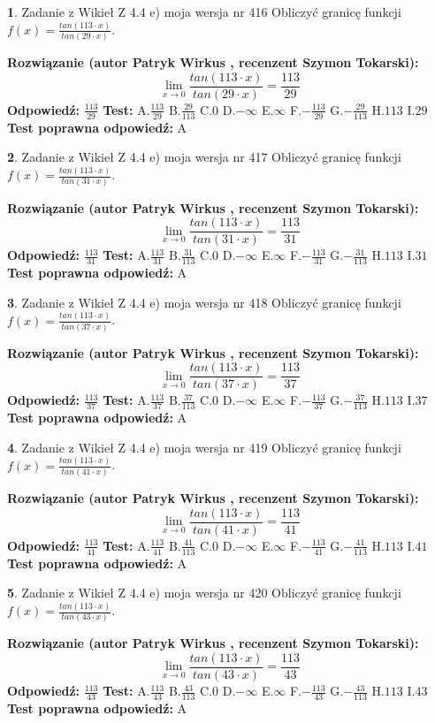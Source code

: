 \documentclass[12pt, a4paper]{article}
\theoremstyle{definition} %
\newtheorem{zad}{}
\newcommand{\zadStart}[1]{\begin{zad}#1\newline}
\newcommand{\zadStop}{\end{zad}}
\newcommand{\rozwStart}[2]{\noindent \textbf{Rozwiązanie (autor #1 , recenzent #2): }\newline}
\newcommand{\rozwStop}{\newline}
\newcommand{\odpStart}{\noindent \textbf{Odpowiedź:}\newline}
\newcommand{\odpStop}{\newline}
\newcommand{\testStart}{\noindent \textbf{Test:}\newline}
\newcommand{\testStop}{\newline}
\newcommand{\kluczStart}{\noindent \textbf{Test poprawna odpowiedź:}\newline}
\newcommand{\kluczStop}{\newline}
\begin{document}
\zadStart{Zadanie z Wikieł Z 4.4 e) moja wersja nr 416}
Obliczyć granicę funkcji $f(x)=\frac{tan(113\cdot x)}{tan(29\cdot x)}$.
\zadStop
\rozwStart{Patryk Wirkus}{Szymon Tokarski}
$$\lim\limits_{x\to 0}\frac{tan(113\cdot x)}{tan(29\cdot x)}=
\frac{113}{29}$$
\rozwStop
\odpStart
$\frac{113}{29}$
\odpStop
\testStart
A.$\frac{113}{29}$
B.$\frac{29}{113}$
C.$0$
D.$-\infty$
E.$\infty$
F.$-\frac{113}{29}$
G.$-\frac{29}{113}$
H.$113$
I.$29$
\testStop
\kluczStart
A
\kluczStop



\zadStart{Zadanie z Wikieł Z 4.4 e) moja wersja nr 417}
Obliczyć granicę funkcji $f(x)=\frac{tan(113\cdot x)}{tan(31\cdot x)}$.
\zadStop
\rozwStart{Patryk Wirkus}{Szymon Tokarski}
$$\lim\limits_{x\to 0}\frac{tan(113\cdot x)}{tan(31\cdot x)}=
\frac{113}{31}$$
\rozwStop
\odpStart
$\frac{113}{31}$
\odpStop
\testStart
A.$\frac{113}{31}$
B.$\frac{31}{113}$
C.$0$
D.$-\infty$
E.$\infty$
F.$-\frac{113}{31}$
G.$-\frac{31}{113}$
H.$113$
I.$31$
\testStop
\kluczStart
A
\kluczStop



\zadStart{Zadanie z Wikieł Z 4.4 e) moja wersja nr 418}
Obliczyć granicę funkcji $f(x)=\frac{tan(113\cdot x)}{tan(37\cdot x)}$.
\zadStop
\rozwStart{Patryk Wirkus}{Szymon Tokarski}
$$\lim\limits_{x\to 0}\frac{tan(113\cdot x)}{tan(37\cdot x)}=
\frac{113}{37}$$
\rozwStop
\odpStart
$\frac{113}{37}$
\odpStop
\testStart
A.$\frac{113}{37}$
B.$\frac{37}{113}$
C.$0$
D.$-\infty$
E.$\infty$
F.$-\frac{113}{37}$
G.$-\frac{37}{113}$
H.$113$
I.$37$
\testStop
\kluczStart
A
\kluczStop



\zadStart{Zadanie z Wikieł Z 4.4 e) moja wersja nr 419}
Obliczyć granicę funkcji $f(x)=\frac{tan(113\cdot x)}{tan(41\cdot x)}$.
\zadStop
\rozwStart{Patryk Wirkus}{Szymon Tokarski}
$$\lim\limits_{x\to 0}\frac{tan(113\cdot x)}{tan(41\cdot x)}=
\frac{113}{41}$$
\rozwStop
\odpStart
$\frac{113}{41}$
\odpStop
\testStart
A.$\frac{113}{41}$
B.$\frac{41}{113}$
C.$0$
D.$-\infty$
E.$\infty$
F.$-\frac{113}{41}$
G.$-\frac{41}{113}$
H.$113$
I.$41$
\testStop
\kluczStart
A
\kluczStop



\zadStart{Zadanie z Wikieł Z 4.4 e) moja wersja nr 420}
Obliczyć granicę funkcji $f(x)=\frac{tan(113\cdot x)}{tan(43\cdot x)}$.
\zadStop
\rozwStart{Patryk Wirkus}{Szymon Tokarski}
$$\lim\limits_{x\to 0}\frac{tan(113\cdot x)}{tan(43\cdot x)}=
\frac{113}{43}$$
\rozwStop
\odpStart
$\frac{113}{43}$
\odpStop
\testStart
A.$\frac{113}{43}$
B.$\frac{43}{113}$
C.$0$
D.$-\infty$
E.$\infty$
F.$-\frac{113}{43}$
G.$-\frac{43}{113}$
H.$113$
I.$43$
\testStop
\kluczStart
A
\kluczStop
\end{document}
